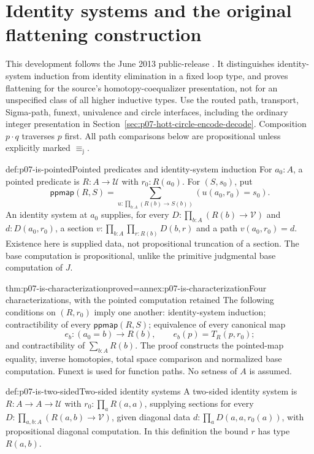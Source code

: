 \section{Identity systems and the original flattening construction}
\label{sec:p07-hott-identity-systems-and-flattening}

This development follows the June 2013 public-release
\cite[\S5.8, \S6.12, \S8.1]{HoTT2013PublicReleaseFoundations}.
It distinguishes identity-system induction from identity elimination in a
fixed loop type, and proves flattening for the source's homotopy-coequalizer
presentation, not for an unspecified class of all higher inductive types.
Use the routed path, transport, Sigma-path, funext, univalence and circle
interfaces, including the ordinary integer presentation in
Section~\ref{sec:p07-hott-circle-encode-decode}.
Composition \(p\cdot q\) traverses \(p\) first. All path comparisons below
are propositional unless explicitly marked \(\equiv_{\mathrm j}\).

\begin{hbdefinition}{def:p07-is-pointed}{Pointed predicates and identity-system induction}
For \(a_0:A\), a pointed predicate is \(R:A\to\mathcal U\) with
\(r_0:R(a_0)\). For \((S,s_0)\), put
\[
\mathsf{ppmap}(R,S)=
 \sum_{u:\prod_{b:A}(R(b)\to S(b))}(u(a_0,r_0)=s_0).
\]
An identity system at \(a_0\) supplies, for every
\(D:\prod_{b:A}(R(b)\to\mathcal V)\) and \(d:D(a_0,r_0)\),
a section \(v:\prod_{b:A}\prod_{r:R(b)}D(b,r)\) and a path
\(v(a_0,r_0)=d\). Existence here is supplied data, not propositional
truncation of a section. The base computation is propositional, unlike
the primitive judgmental base computation of \(J\).
\end{hbdefinition}

\begin{hbtheorem}{thm:p07-is-characterization}{proved=annex:p07-is-characterization}{Four characterizations, with the pointed computation retained}
The following conditions on \((R,r_0)\) imply one another:
identity-system induction; contractibility of every
\(\mathsf{ppmap}(R,S)\); equivalence of every canonical map
\[
e_b:(a_0=b)\to R(b),\qquad e_b(p)=T_R(p,r_0);
\]
and contractibility of \(\sum_{b:A}R(b)\).
The proof constructs the pointed-map equality, inverse homotopies, total
space comparison and normalized base computation.
Funext is used for function paths. No setness of \(A\) is assumed.
\end{hbtheorem}

\begin{hbdefinition}{def:p07-is-two-sided}{Two-sided identity systems}
A two-sided identity system is \(R:A\to A\to\mathcal U\) with
\(r_0:\prod_aR(a,a)\), supplying sections for every
\(D:\prod_{a,b:A}(R(a,b)\to\mathcal V)\), given diagonal data
\(d:\prod_aD(a,a,r_0(a))\), with propositional diagonal computation.
In this definition the bound \(r\) has type \(R(a,b)\).
\end{hbdefinition}

